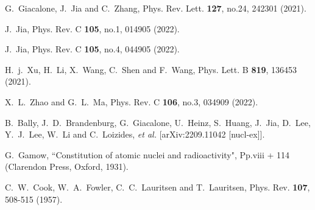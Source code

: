 \documentclass[aps,prc,twocolumn,floatfix,12pts,superscriptaddress]{revtex4}
\begin{document}
{{\begin{thebibliography}{99}
G.~Giacalone, J.~Jia and C.~Zhang,
Phys. Rev. Lett. \textbf{127}, no.24, 242301 (2021).

J.~Jia,
Phys. Rev. C \textbf{105}, no.1, 014905 (2022).

J.~Jia,
Phys. Rev. C \textbf{105}, no.4, 044905 (2022).

H.~j.~Xu, H.~Li, X.~Wang, C.~Shen and F.~Wang,
Phys. Lett. B \textbf{819}, 136453 (2021).

X.~L.~Zhao and G.~L.~Ma,
Phys. Rev. C \textbf{106}, no.3, 034909 (2022).

B.~Bally, J.~D.~Brandenburg, G.~Giacalone, U.~Heinz, S.~Huang, J.~Jia, D.~Lee, Y.~J.~Lee, W.~Li and C.~Loizides, \textit{et al.}
[arXiv:2209.11042 [nucl-ex]].

G.~Gamow, {``Constitution of atomic nuclei and radioactivity"}, Pp.viii + 114 (Clarendon Press, Oxford, 1931).

C.~W.~Cook, W.~A.~Fowler, C.~C.~Lauritsen and T.~Lauritsen,
Phys. Rev. \textbf{107}, 508-515 (1957).


\end{thebibliography}}}
\end{document}

